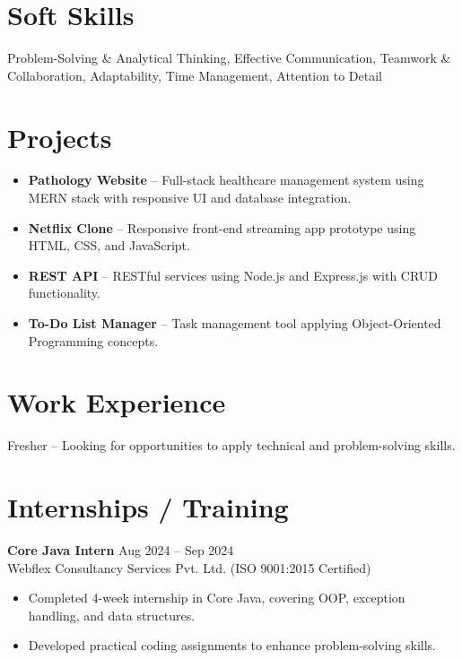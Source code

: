\documentclass[a4paper,11pt]{article}
\begin{document}
\section*{Soft Skills}
Problem-Solving \& Analytical Thinking, Effective Communication, Teamwork \& Collaboration, Adaptability, Time Management, Attention to Detail

\section*{Projects}
\begin{itemize}[leftmargin=*]
  \item \textbf{Pathology Website} – Full-stack healthcare management system using MERN stack with responsive UI and database integration.
  \item \textbf{Netflix Clone} – Responsive front-end streaming app prototype using HTML, CSS, and JavaScript.
  \item \textbf{REST API} – RESTful services using Node.js and Express.js with CRUD functionality.
  \item \textbf{To-Do List Manager} – Task management tool applying Object-Oriented Programming concepts.
\end{itemize}

\section*{Work Experience}
Fresher – Looking for opportunities to apply technical and problem-solving skills.

\section*{Internships / Training}
\textbf{Core Java Intern} \hfill Aug 2024 -- Sep 2024 \\
Webflex Consultancy Services Pvt. Ltd. (ISO 9001:2015 Certified)
\begin{itemize}[leftmargin=*]
  \item Completed 4-week internship in Core Java, covering OOP, exception handling, and data structures.
  \item Developed practical coding assignments to enhance problem-solving skills.
\end{itemize}
\end{document}
